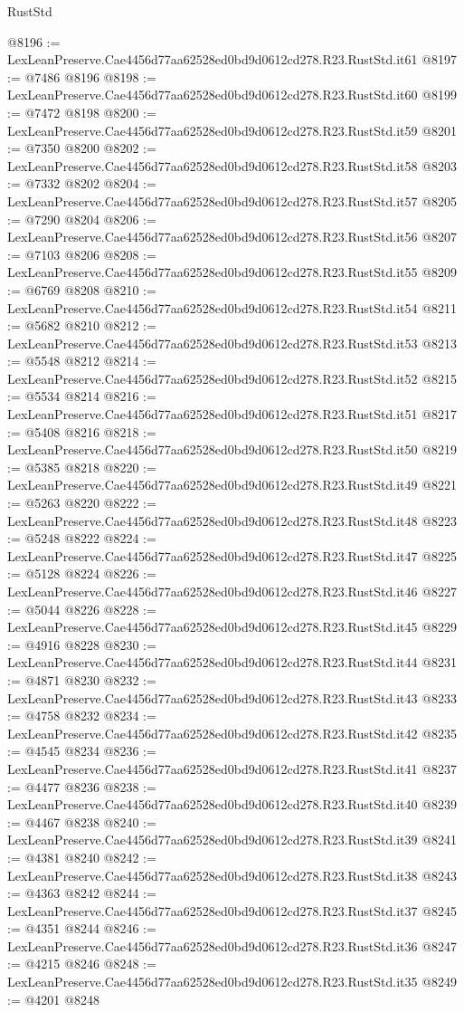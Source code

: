 \begin{lexlean}{RustStd}
\begin{coremodule}
@8196 := LexLeanPreserve.Cae4456d77aa62528ed0bd9d0612cd278.R23.RustStd.it61
@8197 := @7486 @8196
@8198 := LexLeanPreserve.Cae4456d77aa62528ed0bd9d0612cd278.R23.RustStd.it60
@8199 := @7472 @8198
@8200 := LexLeanPreserve.Cae4456d77aa62528ed0bd9d0612cd278.R23.RustStd.it59
@8201 := @7350 @8200
@8202 := LexLeanPreserve.Cae4456d77aa62528ed0bd9d0612cd278.R23.RustStd.it58
@8203 := @7332 @8202
@8204 := LexLeanPreserve.Cae4456d77aa62528ed0bd9d0612cd278.R23.RustStd.it57
@8205 := @7290 @8204
@8206 := LexLeanPreserve.Cae4456d77aa62528ed0bd9d0612cd278.R23.RustStd.it56
@8207 := @7103 @8206
@8208 := LexLeanPreserve.Cae4456d77aa62528ed0bd9d0612cd278.R23.RustStd.it55
@8209 := @6769 @8208
@8210 := LexLeanPreserve.Cae4456d77aa62528ed0bd9d0612cd278.R23.RustStd.it54
@8211 := @5682 @8210
@8212 := LexLeanPreserve.Cae4456d77aa62528ed0bd9d0612cd278.R23.RustStd.it53
@8213 := @5548 @8212
@8214 := LexLeanPreserve.Cae4456d77aa62528ed0bd9d0612cd278.R23.RustStd.it52
@8215 := @5534 @8214
@8216 := LexLeanPreserve.Cae4456d77aa62528ed0bd9d0612cd278.R23.RustStd.it51
@8217 := @5408 @8216
@8218 := LexLeanPreserve.Cae4456d77aa62528ed0bd9d0612cd278.R23.RustStd.it50
@8219 := @5385 @8218
@8220 := LexLeanPreserve.Cae4456d77aa62528ed0bd9d0612cd278.R23.RustStd.it49
@8221 := @5263 @8220
@8222 := LexLeanPreserve.Cae4456d77aa62528ed0bd9d0612cd278.R23.RustStd.it48
@8223 := @5248 @8222
@8224 := LexLeanPreserve.Cae4456d77aa62528ed0bd9d0612cd278.R23.RustStd.it47
@8225 := @5128 @8224
@8226 := LexLeanPreserve.Cae4456d77aa62528ed0bd9d0612cd278.R23.RustStd.it46
@8227 := @5044 @8226
@8228 := LexLeanPreserve.Cae4456d77aa62528ed0bd9d0612cd278.R23.RustStd.it45
@8229 := @4916 @8228
@8230 := LexLeanPreserve.Cae4456d77aa62528ed0bd9d0612cd278.R23.RustStd.it44
@8231 := @4871 @8230
@8232 := LexLeanPreserve.Cae4456d77aa62528ed0bd9d0612cd278.R23.RustStd.it43
@8233 := @4758 @8232
@8234 := LexLeanPreserve.Cae4456d77aa62528ed0bd9d0612cd278.R23.RustStd.it42
@8235 := @4545 @8234
@8236 := LexLeanPreserve.Cae4456d77aa62528ed0bd9d0612cd278.R23.RustStd.it41
@8237 := @4477 @8236
@8238 := LexLeanPreserve.Cae4456d77aa62528ed0bd9d0612cd278.R23.RustStd.it40
@8239 := @4467 @8238
@8240 := LexLeanPreserve.Cae4456d77aa62528ed0bd9d0612cd278.R23.RustStd.it39
@8241 := @4381 @8240
@8242 := LexLeanPreserve.Cae4456d77aa62528ed0bd9d0612cd278.R23.RustStd.it38
@8243 := @4363 @8242
@8244 := LexLeanPreserve.Cae4456d77aa62528ed0bd9d0612cd278.R23.RustStd.it37
@8245 := @4351 @8244
@8246 := LexLeanPreserve.Cae4456d77aa62528ed0bd9d0612cd278.R23.RustStd.it36
@8247 := @4215 @8246
@8248 := LexLeanPreserve.Cae4456d77aa62528ed0bd9d0612cd278.R23.RustStd.it35
@8249 := @4201 @8248

\end{coremodule}
\end{lexlean}
